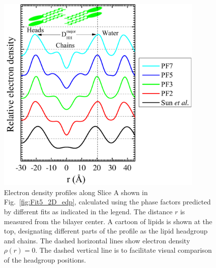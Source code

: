 \begin{figure}[htbp]
  \centering
  \includegraphics[width=0.9\textwidth]{figures/ripple/LAXS/major_diff_models}
  \caption[Electron density profiles along Slice A shown in 
  Fig.~\ref{fig:Fit5_2D_edp}, calculated using the phase factors
  predicted by different fits as indicated in the legend]
  {Electron density profiles along Slice A shown in 
  Fig.~\ref{fig:Fit5_2D_edp}, calculated using the phase factors
  predicted by different fits as indicated in the legend. 
  The distance $r$ is measured from the bilayer center. 
  A cartoon of lipids is shown at the top, designating different parts of the
  profile as the lipid headgroup and chains. 
  The dashed horizontal lines show electron density $\rho(r)=0$. 
  The dashed vertical line is to facilitate visual comparison of the headgroup
  positions.}
  \label{fig:major_diff_models}
\end{figure}

